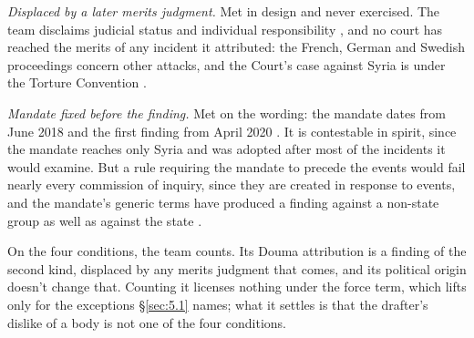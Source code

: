 \emph{Displaced by a later merits judgment.} Met in design and never exercised. The team disclaims judicial status and individual responsibility \autocite{opcw2026iitpage}, and no court has reached the merits of any incident it attributed: the French, German and Swedish proceedings concern other attacks, and the Court's case against Syria is under the Torture Convention \autocite{osji2021frenchcw,icj2023canadasyria}.

\emph{Mandate fixed before the finding.} Met on the wording: the mandate dates from June 2018 and the first finding from April 2020 \autocite{opcw2020iitltamenah}. It is contestable in spirit, since the mandate reaches only Syria and was adopted after most of the incidents it would examine. But a rule requiring the mandate to precede the events would fail nearly every commission of inquiry, since they are created in response to events, and the mandate's generic terms have produced a finding against a non-state group as well as against the state \autocite{opcw2024iitmarea}.

On the four conditions, the team counts. Its Douma attribution \autocite{opcw2023iitdouma} is a finding of the second kind, displaced by any merits judgment that comes, and its political origin doesn't change that. Counting it licenses nothing under the force term, which lifts only for the exceptions \S\ref{sec:5.1} names; what it settles is that the drafter's dislike of a body is not one of the four conditions.
